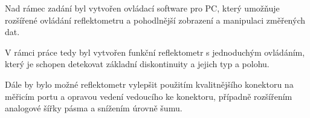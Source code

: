 Nad rámec zadání byl vytvořen ovládací software pro PC, který umožňuje rozšířené ovládání reflektometru a pohodlnější zobrazení a manipulaci změřených dat.

V rámci práce tedy byl vytvořen funkční reflektometr s jednoduchým ovládáním, který je schopen detekovat základní diskontinuity a jejich typ a polohu.

Dále by bylo možné reflektometr vylepšit použitím kvalitnějšího konektoru na měřicím portu a opravou vedení vedoucího ke konektoru, případně rozšířením analogové šířky pásma a snížením úrovně šumu.